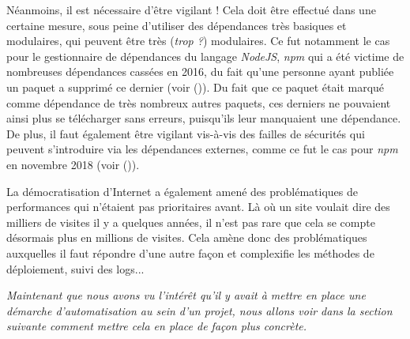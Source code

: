 \clearpage

Néanmoins, il est nécessaire d'être vigilant ! Cela doit être effectué dans une certaine mesure, sous peine d'utiliser des dépendances très basiques et modulaires, qui peuvent être très (\emph{trop ?}) modulaires. Ce fut notamment le cas pour le gestionnaire de dépendances du langage \emph{NodeJS}, \emph{npm} qui a été victime de nombreuses dépendances cassées en 2016, du fait qu'une personne ayant publiée un paquet a supprimé ce dernier (voir  \cite{npm-missing-deps} ()). Du fait que ce paquet était marqué comme dépendance de très nombreux autres paquets, ces derniers ne pouvaient ainsi plus se télécharger sans erreurs, puisqu'ils leur manquaient une dépendance. De plus, il faut également être vigilant vis-à-vis des failles de sécurités qui peuvent s'introduire via les dépendances externes, comme ce fut le cas pour \emph{npm} en novembre 2018 (voir  \cite{npm-faille} ()).

La démocratisation d'Internet a également amené des problématiques de performances qui n'étaient pas prioritaires avant. Là où un site  voulait dire des milliers de visites il y a quelques années, il n'est pas rare que cela se compte désormais plus en millions de visites. Cela amène donc des problématiques auxquelles il faut répondre d'une autre façon et complexifie les méthodes de déploiement, suivi des logs...

\hrulefill

\emph{Maintenant que nous avons vu l'intérêt qu'il y avait à mettre en place une démarche d'automatisation au sein d'un projet, nous allons voir dans la section suivante comment mettre cela en place de façon plus concrète.}